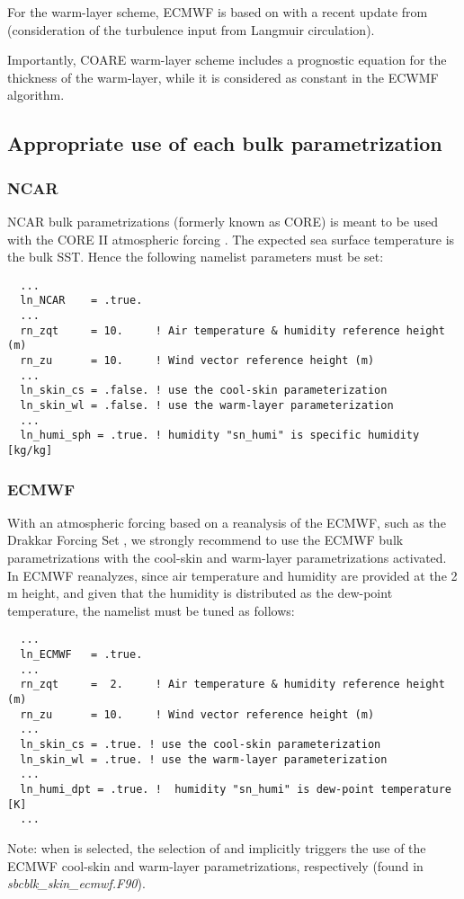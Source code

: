\documentclass[../main/NEMO_manual]{subfiles}
\begin{document}
For the warm-layer scheme, ECMWF is based on \citet{zeng.beljaars_GRL05} with a
recent update from \citet{takaya.bidlot.ea_JGR10} (consideration of the
turbulence input from Langmuir circulation).

Importantly, COARE warm-layer scheme \citep{fairall.ea_19} includes a prognostic
equation for the thickness of the warm-layer, while it is considered as constant
in the ECWMF algorithm.


\subsection{Appropriate use of each bulk parametrization}

\subsubsection{NCAR}

NCAR bulk parametrizations (formerly known as CORE) is meant to be used with the
CORE II atmospheric forcing \citep{large.yeager_CD09}. The expected sea surface
temperature is the bulk SST. Hence the following namelist parameters must be
set:
%
\begin{verbatim}
  ...
  ln_NCAR    = .true.
  ...
  rn_zqt     = 10.     ! Air temperature & humidity reference height (m)
  rn_zu      = 10.     ! Wind vector reference height (m)
  ...
  ln_skin_cs = .false. ! use the cool-skin parameterization
  ln_skin_wl = .false. ! use the warm-layer parameterization
  ...
  ln_humi_sph = .true. ! humidity "sn_humi" is specific humidity  [kg/kg]
\end{verbatim}


\subsubsection{ECMWF}
%
With an atmospheric forcing based on a reanalysis of the ECMWF, such as the
Drakkar Forcing Set \citep{brodeau.barnier.ea_OM10}, we strongly recommend to
use the ECMWF bulk parametrizations with the cool-skin and warm-layer
parametrizations activated. In ECMWF reanalyzes, since air temperature and
humidity are provided at the 2\,m height, and given that the humidity is
distributed as the dew-point temperature, the namelist must be tuned as follows:
%
\begin{verbatim}
  ...
  ln_ECMWF   = .true.
  ...     
  rn_zqt     =  2.     ! Air temperature & humidity reference height (m)
  rn_zu      = 10.     ! Wind vector reference height (m)
  ...
  ln_skin_cs = .true. ! use the cool-skin parameterization
  ln_skin_wl = .true. ! use the warm-layer parameterization
  ...
  ln_humi_dpt = .true. !  humidity "sn_humi" is dew-point temperature [K]
  ...
\end{verbatim}
%
Note: when  is selected, the selection
of  and  implicitly
triggers the use of the ECMWF cool-skin and warm-layer parametrizations,
respectively (found in \textit{sbcblk\_skin\_ecmwf.F90}).
\end{document}
